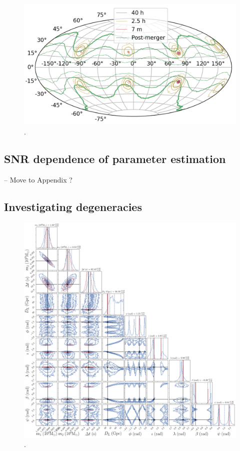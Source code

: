 \documentclass[aps,showpacs,twocolumn,prd,superscriptaddress,nofootinbib]{revtex4-1}
\begin{document}
\begin{figure}
  \centering
  \includegraphics[width=.8\linewidth]{../plots/plot_mollweide_tseries.png}
  \caption{.}
  \label{fig:MollweidesmbhTserieshmCase9}
\end{figure}


\subsection{SNR dependence of parameter estimation}
\label{sec:SMBHPEdistance}

-- Move to Appendix ?


\subsection{Investigating degeneracies}
\label{sec:SMBHPEdegen}

\begin{figure}
  \centering
  \includegraphics[width=.98\linewidth]{../plots/corner_smbh_case9_ptmcmc_22_hm.png}
  \caption{.}
  \label{fig:PEsmbh22hmCase0}
\end{figure}
\end{document}

